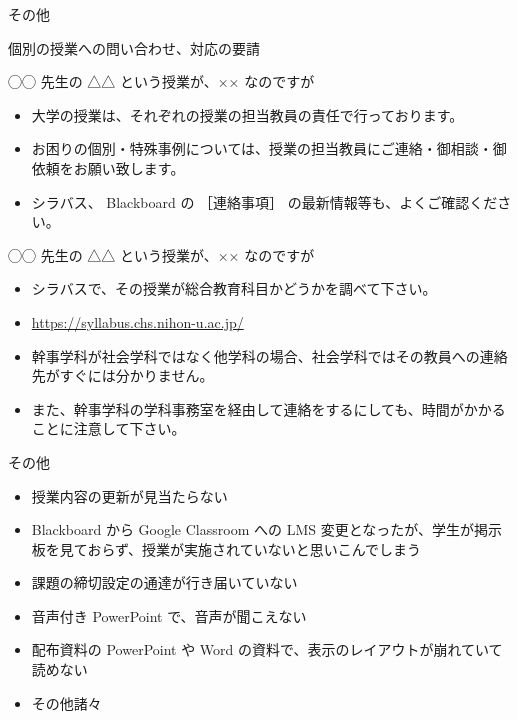 \documentclass[a4j,10pt]{jsarticle}
\def\lthtmlcheckvsize{\ifdim\ht\sizebox<\vsize 
  \ifdim\wd\sizebox<\hsize\expandafter\hfill\fi \expandafter\vfill
  \else\expandafter\vss\fi}%
\begin{document}
{\newpage\clearpage
{}%
\begin{frame}[label={sec:orgfeb9e6e},fragile]{その他}
\begin{block}{個別の授業への問い合わせ、対応の要請}
\begin{block}{◯◯ 先生の △△ という授業が、×× なのですが}
\begin{itemize}
\item 大学の授業は、それぞれの授業の担当教員の責任で行っております。
\item お困りの個別・特殊事例については、授業の担当教員にご連絡・御相談・御依頼をお願い致します。
\item シラバス、 Blackboard の ［連絡事項］ の最新情報等も、よくご確認ください。
\end{itemize}
\end{block}
\par
\begin{block}{◯◯ 先生の △△ という授業が、×× なのですが}
\begin{itemize}
\item シラバスで、その授業が総合教育科目かどうかを調べて下さい。
\item \url{https://syllabus.chs.nihon-u.ac.jp/}
\item 幹事学科が社会学科ではなく他学科の場合、社会学科ではその教員への連絡先がすぐには分かりません。
\item また、幹事学科の学科事務室を経由して連絡をするにしても、時間がかかることに注意して下さい。
\end{itemize}
\end{block}
\par
\begin{block}{その他}
\begin{itemize}
\item 授業内容の更新が見当たらない
\item Blackboard から Google Classroom への LMS 変更となったが、学生が掲示板を見ておらず、授業が実施されていないと思いこんでしまう
\item 課題の締切設定の通達が行き届いていない
\item 音声付き PowerPoint で、音声が聞こえない
\item 配布資料の PowerPoint や Word の資料で、表示のレイアウトが崩れていて読めない
\item その他諸々
\end{itemize}
\end{block}
\end{block}
\end{frame}%
\lthtmlfigureZ
\lthtmlcheckvsize\clearpage}
\end{document}
